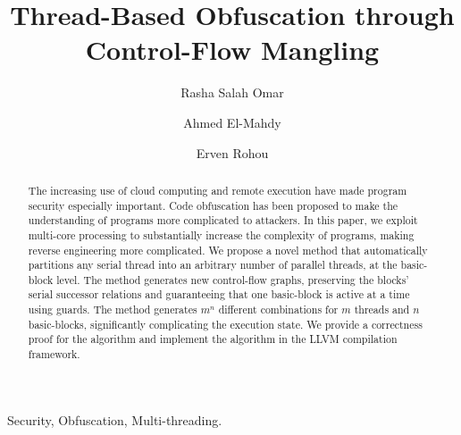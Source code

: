 \documentclass[3p,times,procedia,twocolumn,letterpaper]{elsarticle}
\begin{document}
\begin{frontmatter}



\title{Thread-Based Obfuscation through Control-Flow Mangling}








\author{Rasha Salah Omar}

\author{Ahmed El-Mahdy}


\author{Erven Rohou}







  

\begin{abstract}

The increasing use of cloud computing and remote execution have made program security especially important. Code obfuscation has been proposed to make the understanding of programs more complicated to attackers. In this paper, we exploit multi-core processing to substantially increase the complexity of programs, making reverse engineering more complicated. We propose a novel method that automatically partitions any serial thread into an arbitrary number of parallel threads, at the basic-block level. The method generates new control-flow graphs, preserving the blocks' serial successor relations and guaranteeing that one basic-block is active at a time using guards. The method generates $m^n$ different combinations for $m$ threads and $n$ basic-blocks, significantly complicating the execution state. We provide a correctness proof for the algorithm and implement the algorithm in the LLVM compilation framework.
\end{abstract}

\begin{keyword}
Security, Obfuscation, Multi-threading.
\end{keyword}


\end{frontmatter}
\end{document}
